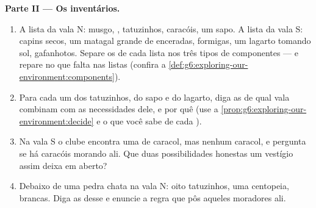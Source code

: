 \begin{problem}
\medskip\noindent\textbf{Parte II --- Os inventários.}
\begin{enumerate}[resume]
  \item A lista da vala N: musgo, , tatuzinhos, caracóis,
        um sapo. A lista da vala S: capins secos, um matagal grande
        de  enceradas, formigas, um lagarto tomando sol,
        gafanhotos. Separe os  de cada lista nos três tipos de
        componentes --- e repare no que falta nas listas (confira a
        \cref{def:g6:exploring-our-environment:components}).
  \item Para cada um dos tatuzinhos, do sapo e do lagarto, diga as
         de qual vala combinam com as necessidades dele, e
        por quê (use a
        \cref{prop:g6:exploring-our-environment:decide} e o que você
        sabe de cada ).
  \item Na vala S o clube encontra uma  de caracol, mas nenhum
        caracol, e pergunta se há caracóis morando ali. Que duas
        possibilidades honestas um vestígio assim deixa em aberto?
  \item Debaixo de uma pedra chata na vala N: oito tatuzinhos, uma
        centopeia,  brancas. Diga as  desse
         e enuncie a regra que pôs aqueles moradores ali.
\end{enumerate}


\end{problem}

